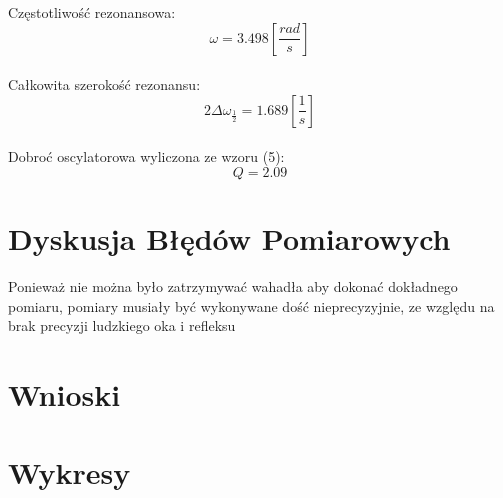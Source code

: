 \documentclass[]{article}
\begin{document}
	Częstotliwość rezonansowa:
	$$\omega = 3.498 \left[ \frac{rad}{s}\right]$$\\
	Całkowita szerokość rezonansu:
	$$2\Delta\omega_{\frac{1}{2}} = 1.689 \left[ \frac{1}{s}\right] $$\\	
	Dobroć oscylatorowa wyliczona ze wzoru (5):
	$$Q = 2.09$$
	
	\section{Dyskusja Błędów Pomiarowych}
	Ponieważ nie można było zatrzymywać wahadła aby dokonać dokładnego pomiaru, pomiary musiały być wykonywane dość nieprecyzyjnie, ze względu na brak precyzji ludzkiego oka i refleksu
	\section{Wnioski}
	\section{Wykresy}
\end{document}
